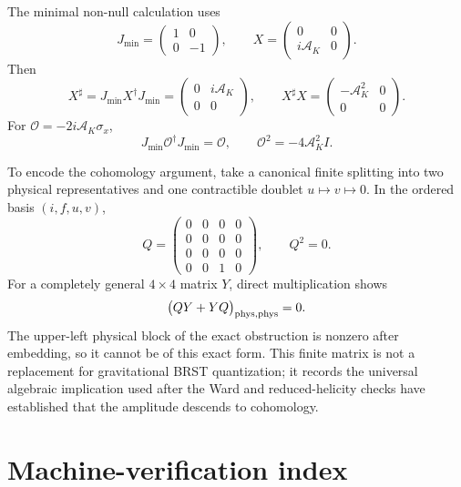 \documentclass[11pt]{article}
\theoremstyle{definition}
\theoremstyle{remark}
\newcommand{\dg}{\dagger}
\newcommand{\AK}{\mathcal A_K}
\begin{document}
The minimal non-null calculation uses
\begin{equation}
J_{\min}=\begin{pmatrix}1&0\\0&-1\end{pmatrix},
\qquad
X=\begin{pmatrix}0&0\\i\AK&0\end{pmatrix}.
\end{equation}
Then
\begin{equation}
X^\sharp=J_{\min}X^{\dg}J_{\min}
=\begin{pmatrix}0&i\AK\\0&0\end{pmatrix},
\qquad
X^\sharp X=\begin{pmatrix}-\AK^2&0\\0&0\end{pmatrix}.
\end{equation}
For $\mathcal O=-2i\AK\sigma_x$,
\begin{equation}
J_{\min}\mathcal O^{\dg}J_{\min}=\mathcal O,
\qquad \mathcal O^2=-4\AK^2I.
\end{equation}

To encode the cohomology argument, take a canonical finite splitting into
two physical representatives and one contractible doublet $u\mapsto
v\mapsto0$.  In the ordered basis $(i,f,u,v)$,
\begin{equation}
Q=\begin{pmatrix}
0&0&0&0\\
0&0&0&0\\
0&0&0&0\\
0&0&1&0
\end{pmatrix},
\qquad Q^2=0.
\end{equation}
For a completely general $4\times4$ matrix $Y$, direct multiplication
shows
\begin{equation}
\bigl(QY+YQ\bigr)_{\rm phys,phys}=0.
\end{equation}
The upper-left physical block of the exact obstruction is nonzero after
embedding, so it cannot be of this exact form.  This finite matrix is not
a replacement for gravitational BRST quantization; it records the
universal algebraic implication used after the Ward and reduced-helicity
checks have established that the amplitude descends to cohomology.

\section{Machine-verification index}
\label{app:checks}
\end{document}
